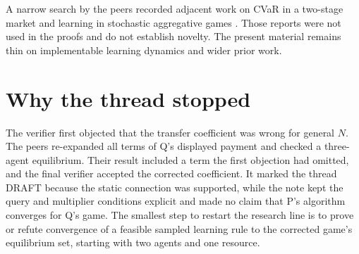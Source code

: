 \documentclass{article}
\begin{document}
A narrow search by the peers recorded adjacent work on CVaR in a two-stage market \cite{dahlinJain} and learning in
stochastic aggregative games \cite{duMeng}. Those reports were not used in the proofs and do not establish novelty. The
present material remains thin on implementable learning dynamics and wider prior work.

\section{Why the thread stopped}

The verifier first objected that the transfer coefficient was wrong for general \(N\). The peers re-expanded all terms
of Q's displayed payment and checked a three-agent equilibrium. Their result included a term the first objection had
omitted, and the final verifier accepted the corrected coefficient. It marked the thread DRAFT because the static
connection was supported, while the note kept the query and multiplier conditions explicit and made no claim that P's
algorithm converges for Q's game. The smallest step to restart the research line is to prove or refute convergence of a
feasible sampled learning rule to the corrected game's equilibrium set, starting with two agents and one resource.



\end{document}
